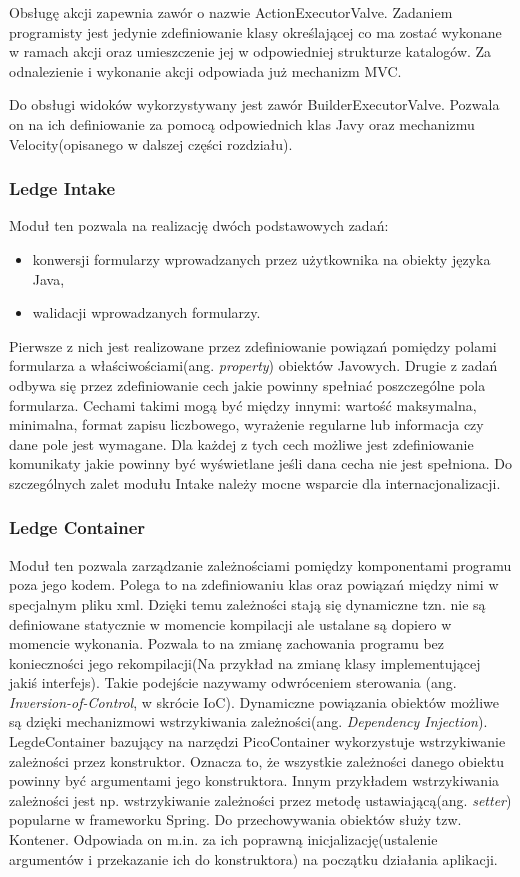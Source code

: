 Obsługę akcji zapewnia zawór o nazwie ActionExecutorValve. Zadaniem programisty jest jedynie zdefiniowanie klasy określającej co ma zostać wykonane w ramach akcji oraz umieszczenie jej w odpowiedniej strukturze katalogów. Za odnalezienie i wykonanie akcji odpowiada już mechanizm MVC.

Do obsługi widoków wykorzystywany jest zawór BuilderExecutorValve. Pozwala on na ich definiowanie za pomocą odpowiednich klas Javy oraz mechanizmu Velocity(opisanego w dalszej części rozdziału).

\subsubsection{Ledge Intake}
Moduł ten pozwala na realizację dwóch podstawowych zadań:
\begin{itemize}
	\item konwersji formularzy wprowadzanych przez użytkownika na obiekty języka Java,
	\item walidacji wprowadzanych formularzy.
\end{itemize}
Pierwsze z nich jest realizowane przez zdefiniowanie powiązań pomiędzy polami formularza a właściwościami(ang. \textit{property}) obiektów Javowych. Drugie z zadań odbywa się przez zdefiniowanie cech jakie powinny spełniać poszczególne pola formularza. Cechami takimi mogą być między innymi: wartość maksymalna, minimalna, format zapisu liczbowego, wyrażenie regularne lub informacja czy dane pole jest wymagane. Dla każdej z tych cech możliwe jest zdefiniowanie komunikaty jakie powinny być wyświetlane jeśli dana cecha nie jest spełniona. Do szczególnych zalet modułu Intake należy mocne wsparcie dla internacjonalizacji.

\subsubsection{Ledge Container}
Moduł ten pozwala zarządzanie zależnościami pomiędzy komponentami programu poza jego kodem. Polega to na zdefiniowaniu klas oraz powiązań między nimi w specjalnym pliku xml. Dzięki temu zależności stają się dynamiczne tzn. nie są definiowane statycznie w momencie kompilacji ale ustalane są dopiero w momencie wykonania. Pozwala to na zmianę zachowania programu bez konieczności jego rekompilacji(Na przykład na zmianę klasy implementującej jakiś interfejs). Takie podejście nazywamy odwróceniem sterowania (ang. \textit{Inversion-of-Control}, w skrócie IoC). Dynamiczne powiązania obiektów możliwe są dzięki mechanizmowi wstrzykiwania zależności(ang. \textit{Dependency Injection}). LegdeContainer bazujący na narzędzi PicoContainer wykorzystuje wstrzykiwanie zależności przez konstruktor. Oznacza to, że wszystkie zależności danego obiektu powinny być argumentami jego konstruktora. Innym przykładem wstrzykiwania zależności jest np. wstrzykiwanie zależności przez metodę ustawiającą(ang. \textit{setter}) popularne w frameworku Spring. Do przechowywania obiektów służy tzw. Kontener. Odpowiada on m.in. za ich poprawną inicjalizację(ustalenie argumentów i przekazanie ich do konstruktora) na początku działania aplikacji.

